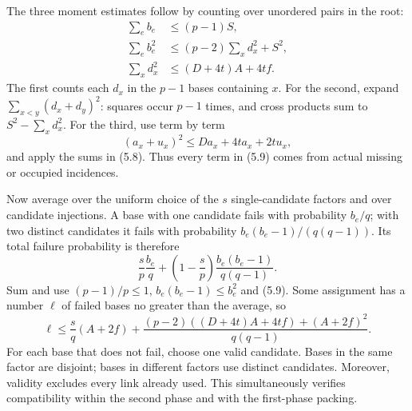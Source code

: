 \documentclass[english,11pt,a4paper]{article}
\begin{document}
The three moment estimates follow by counting over unordered pairs in the root: \[
\begin{aligned}
\sum_e b_e&\le(p-1)S,\\
\sum_e b_e^2&\le(p-2)\sum_xd_x^2+S^2,\\
\sum_xd_x^2&\le(D+4t)A+4tf.
\end{aligned}
\tag{5.9}
\] The first counts each \(d_x\) in the \(p-1\) bases containing \(x\). For the second, expand \(\sum_{x<y}(d_x+d_y)^2\): squares occur \(p-1\) times, and cross products sum to \(S^2-\sum_xd_x^2\). For the third, use term by term \[
(a_x+u_x)^2\le Da_x+4ta_x+2tu_x,
\] and apply the sums in (5.8). Thus every term in (5.9) comes from actual missing or occupied incidences.

Now average over the uniform choice of the \(s\) single-candidate factors and over candidate injections. A base with one candidate fails with probability \(b_e/q\); with two distinct candidates it fails with probability \(b_e(b_e-1)/(q(q-1))\). Its total failure probability is therefore \[
\frac{s}{p}\frac{b_e}{q}
+\left(1-\frac{s}{p}\right)\frac{b_e(b_e-1)}{q(q-1)}.
\tag{5.10}
\] Sum and use \((p-1)/p\le1\), \(b_e(b_e-1)\le b_e^2\) and (5.9). Some assignment has a number \(\ell\) of failed bases no greater than the average, so \[
\ell\le\frac{s}{q}(A+2f)
+\frac{(p-2)((D+4t)A+4tf)+(A+2f)^2}{q(q-1)}.
\tag{5.11}
\] For each base that does not fail, choose one valid candidate. Bases in the same factor are disjoint; bases in different factors use distinct candidates. Moreover, validity excludes every link already used. This simultaneously verifies compatibility within the second phase and with the first-phase packing.
\end{document}
